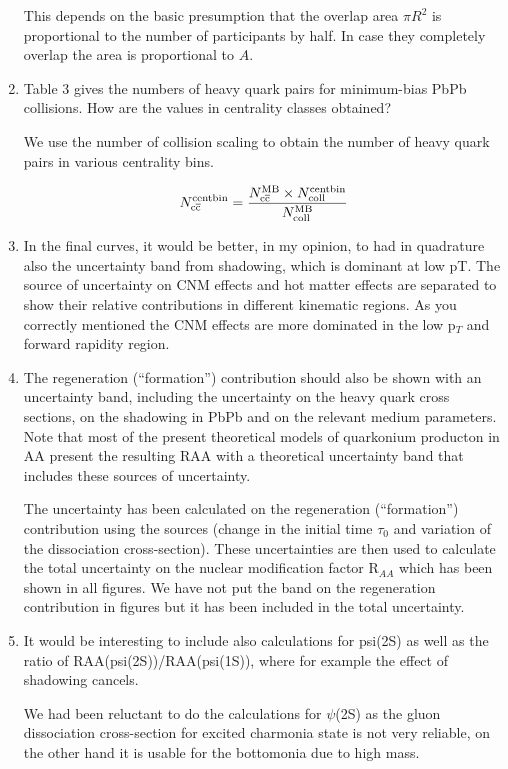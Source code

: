 \documentclass[a4paper,11pt]{article}
\begin{document}
\begin{enumerate}
  {\color{blue} This depends on the basic presumption that the overlap area $\pi R^2$ is proportional
    to the number of participants by half. In case they completely overlap the area is proportional to $A$. 
  }


\item Table 3 gives the numbers of heavy quark pairs for minimum-bias PbPb collisions. How are the values in centrality classes obtained?\newline
  
  {\color{blue} We use the number of collision scaling to obtain the number of heavy quark pairs in various centrality bins. 
    
    \begin{equation}
      N_{\rm c\overline{c}}^{\rm centbin} = \frac{N_{\rm c\overline{c}}^{\rm MB}\times N_{\rm coll}^{\rm centbin}}{N_{\rm coll}^{\rm MB}} 
    \end{equation}
  }

\item In the final curves, it would be better, in my opinion, to had in quadrature also the uncertainty band from shadowing, which is dominant at
  low pT. \newline
  {\color{blue}
    The source of uncertainty on CNM effects and hot matter effects are separated to show their relative contributions in different kinematic regions.
    As you correctly mentioned the CNM effects are more dominated in the low p$_{T}$ and forward rapidity region.  
  }


\item  The regeneration (“formation”) contribution should also be shown with an uncertainty band, including the uncertainty on the heavy quark
  cross sections, on the shadowing in PbPb and on the relevant medium parameters. Note that most of the present theoretical models of quarkonium
  producton in AA present the resulting RAA with a theoretical uncertainty band that includes these sources of uncertainty.


  {\color{blue} 
    The uncertainty has been calculated on the regeneration (“formation”) contribution using the sources
    (change in the initial time $\tau_0$ and variation of the dissociation cross-section).
    These uncertainties are then used to calculate the total uncertainty on the nuclear modification
    factor R$_{AA}$ which has been shown in all figures.
    We have not put the band on the regeneration contribution in figures but it has been included
    in the total uncertainty.}



\item It would be interesting to include also calculations for psi(2S) as well as the ratio of RAA(psi(2S))/RAA(psi(1S)), where for
  example the effect of shadowing cancels. 


  {\color{blue}
    We had been reluctant to do the calculations for $\psi$(2S) as the
    gluon dissociation cross-section for excited charmonia state is not very reliable,
    on the other hand it is usable for the bottomonia due to high mass.
  }

\end{enumerate}
\end{document}

